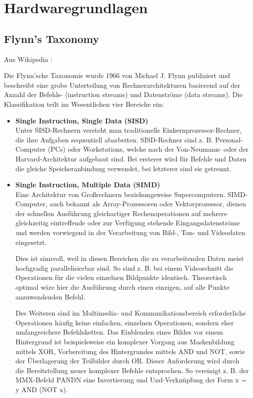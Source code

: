 	\chapter{Hardwaregrundlagen}
		\section{Flynn's Taxonomy}
		Aus Wikipedia \autocite{wikiFT}:
		
		Die Flynn’sche Taxonomie wurde 1966 von Michael J. Flynn publiziert und beschreibt eine grobe Unterteilung von Rechnerarchitekturen basierend auf der Anzahl der Befehls- (instruction streams) und Datenströme (data streams). Die Klassifikation teilt im Wesentlichen vier Bereiche ein:
		
		\begin{itemize}
		\item \textbf{Single Instruction, Single Data (SISD)}\\ Unter SISD-Rechnern versteht man traditionelle Einkernprozessor-Rechner, die ihre Aufgaben sequentiell abarbeiten. SISD-Rechner sind z. B. Personal-Computer (PCs) oder Workstations, welche nach der Von-Neumann- oder der Harvard-Architektur aufgebaut sind. Bei ersterer wird für Befehle und Daten die gleiche Speicheranbindung verwendet, bei letzterer sind sie getrennt. 
		
		\item \textbf{Single Instruction, Multiple Data (SIMD)}\\ Eine Architektur von Großrechnern beziehungsweise Supercomputern. SIMD-Computer, auch bekannt als Array-Prozessoren oder Vektorprozessor, dienen der schnellen Ausführung gleichartiger Rechenoperationen auf mehrere gleichzeitig eintreffende oder zur Verfügung stehende Eingangsdatenströme und werden vorwiegend in der Verarbeitung von Bild-, Ton- und Videodaten eingesetzt.

Dies ist sinnvoll, weil in diesen Bereichen die zu verarbeitenden Daten meist hochgradig parallelisierbar sind. So sind z. B. bei einem Videoschnitt die Operationen für die vielen einzelnen Bildpunkte identisch. Theoretisch optimal wäre hier die Ausführung durch einen einzigen, auf alle Punkte anzuwendenden Befehl.

Des Weiteren sind im Multimedia- und Kommunikationsbereich erforderliche Operationen häufig keine einfachen, einzelnen Operationen, sondern eher umfangreichere Befehlsketten. Das Einblenden eines Bildes vor einem Hintergrund ist beispielsweise ein komplexer Vorgang aus Maskenbildung mittels XOR, Vorbereitung des Hintergrundes mittels AND und NOT, sowie der Überlagerung der Teilbilder durch OR. Dieser Anforderung wird durch die Bereitstellung neuer komplexer Befehle entsprochen. So vereinigt z. B. der MMX-Befehl PANDN eine Invertierung und Und-Verknüpfung der Form x = y AND (NOT x).


\end{itemize}
